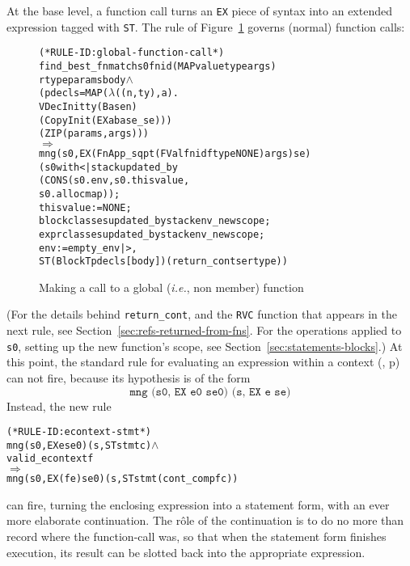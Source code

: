 \documentclass[11pt]{article}
\newcommand{\ie}{\emph{i.e.}}
\begin{document}
 At the base level, a function call turns
an \texttt{EX} piece of syntax into an extended expression tagged with
\texttt{ST}.  The rule  of
Figure~\ref{fig:global-function-call} governs (normal) function calls:
\begin{figure}[hbtp]
\begin{center}
\begin{minipage}{\textwidth}
%
\label{rule:global-function-call}
\begin{alltt}
(* RULE-ID: global-function-call *)
     find_best_fnmatch s0 fnid (MAP valuetype args)
                       rtype params body \(\land\)
     (pdecls = MAP (\(\lambda\)((n,ty),a).
                       VDecInit ty (Base n)
                                   (CopyInit (EX a base_se)))
                   (ZIP (params, args)))
   \(\Rightarrow\)
     mng (s0, EX (FnApp_sqpt (FVal fnid ftype NONE) args) se)
         (s0 with <| stack updated_by 
                       (CONS (s0.env, s0.thisvalue, 
                              s0.allocmap));
                     thisvalue := NONE;
                     blockclasses updated_by stackenv_newscope ;
                     exprclasses updated_by stackenv_newscope ;
                     env := empty_env |>,
          ST (Block T pdecls [body]) (return_cont se rtype))
\end{alltt}
\end{minipage}
\end{center}
\caption{Making a call to a global (\ie, non member) function}
\label{fig:global-function-call}
\end{figure}

%
(For the details behind \texttt{return_cont}, and the \texttt{RVC}
function that appears in the next rule, see
Section~\ref{sec:refs-returned-from-fns}.  For the operations applied
to \texttt{s0}, setting up the new function's scope, see
Section~\ref{sec:statements-blocks}.)  At this point, the standard
rule for evaluating an expression within a context
(, p\pageref{rule:econtext-expr}) can not fire,
because its hypothesis is of the form
\[
\texttt{mng (s0, EX e0 se0) (s, EX e se)}
\]
Instead, the new rule
\label{rule:econtext-stmt}
\begin{alltt}
(* RULE-ID: econtext-stmt *)
     mng (s0, EX e se0) (s, ST stmt c) \(\land\)
     valid_econtext f
   \(\Rightarrow\)
     mng (s0, EX (f e) se0) (s, ST stmt (cont_comp f c))
\end{alltt}
can fire, turning the enclosing expression into a statement form, with
an ever more elaborate continuation.   The r\^ole of the continuation
is to do no more than record where the function-call was, so that when
the statement form finishes execution, its result can be slotted back
into the appropriate expression.
\end{document}
